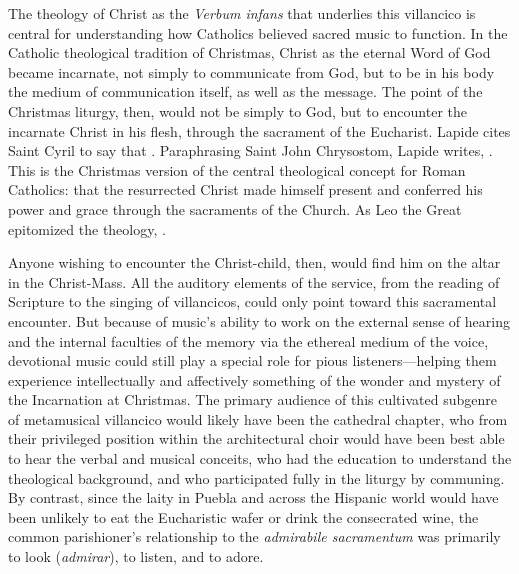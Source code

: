 The theology of Christ as the \emph{Verbum infans} that underlies this
villancico is central for understanding how Catholics believed sacred music to
function.
In the Catholic theological tradition of Christmas, Christ as the eternal Word
of God became incarnate, not simply to communicate  from God, but
to be in his body the medium of communication itself, as well as the message.
The point of the Christmas liturgy, then, would not be simply to  God, but to encounter the incarnate Christ in his flesh, through the
sacrament of the Eucharist.
Lapide cites Saint Cyril to say that .
Paraphrasing Saint John Chrysostom, Lapide writes, .%
    \Autocite
    [672, on Lk 2: .]
    {Lapide:Gospels19C}
This is the Christmas version of the central theological concept for Roman
Catholics: that the resurrected Christ made himself present and conferred his
power and grace through the sacraments of the Church.
As Leo the Great epitomized the theology, .%
    \Autocite
    [398, Sermo II de Ascensione Domini: .]
    {Leo:SermonesPL}

Anyone wishing to encounter the Christ-child, then, would find him on the altar
in the Christ-Mass.
All the auditory elements of the service, from the reading of Scripture to the
singing of villancicos, could only point toward this sacramental encounter.
But because of music's ability to work on the external sense of hearing and the
internal faculties of the memory via the ethereal medium of the voice,
devotional music could still play a special role for pious listeners---helping
them experience intellectually and affectively something of the wonder and
mystery of the Incarnation at Christmas.
The primary audience of this cultivated subgenre of metamusical villancico would
likely have been the cathedral chapter, who from their privileged position
within the architectural choir would have been best able to hear the verbal and
musical conceits, who had the education to understand the theological
background, and who participated fully in the liturgy by communing.
By contrast, since the laity in Puebla and across the Hispanic world would have
been unlikely to eat the Eucharistic wafer or drink the consecrated wine, the
common parishioner's relationship to the \emph{admirabile sacramentum} was
primarily to look (\emph{admirar}), to listen, and to adore.

